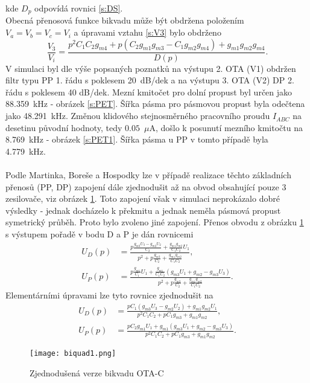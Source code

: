kde $D_p$ odpovídá rovnici \ref{s:DS}.\\
Obecná přenosová funkce bikvadu může být obdržena položením $V_a = V_b = V_c = V_i$ a úpravami vztahu \ref{s:V3} bylo obdrženo
\begin{equation}
\frac{V_3}{V_i} = \frac{p^2C_1C_2g_{m4} + p(C_2g_{m1}g_{m3} - C_1g_{m2}g_{m4}) + g_{m1}g_{m2}g_{m4}}{D(p)}.
\end{equation}
\noindent 
V simulaci byl dle výše popsaných poznatků na výstupu 2. OTA (V1) obdržen filtr typu PP 1. řádu s poklesem 20~dB/dek a na výstupu 3. OTA (V2) DP 2. řádu s poklesem 40 dB/dek. Mezní kmitočet pro dolní propust byl určen jako 88.359~kHz - obrázek \ref{s:PET}. Šířka pásma pro pásmovou propust byla odečtena jako 48.291~kHz. Změnou klidového stejnosměrného pracovního proudu $I_{ABC}$ na desetinu původní hodnoty, tedy $0.05$~$\mu$A, došlo k posunutí mezního kmitočtu na 8.769~kHz - obrázek \ref{s:PET1}. Šířka pásma u PP v tomto případě byla 4.779~kHz.\\
\\
\noindent Podle Martinka, Boreše a Hospodky \cite{12} lze v případě realizace těchto základních přenosů (PP, DP) zapojení dále zjednodušit až na obvod obsahující pouze 3 zesilovače, viz obrázek \ref{s:BIK2}. Toto zapojení však v simulaci neprokázalo dobré výsledky - jednak docházelo k překmitu a jednak neměla pásmová propust symetrický průběh. Proto bylo zvoleno jiné zapojení. Přenos obvodu z obrázku \ref{s:BIK2} s výstupem pořadě v bodu D a P je dán rovnicemi
\begin{align}
U_D(p) &= \frac{p\frac{g_{m3}U_3-g_{m2}U_2}{C_2}+\frac{g_{m1}g_{m2}}{C_1C_2}U_1}{p^2 + p\frac{g_{m3}}{C_2} + \frac{g_{m1}g_{m2}}{C_1C_2}},\\
U_P(p) &= \frac{p\frac{g_{m1}}{C_1}U_1 + \frac{g_{m1}}{C_1C_2}(g_{m3}U_1+g_{m2}-g_{m3}U_3)}{p^2 + p\frac{g_{m3}}{C_2} + \frac{g_{m1}g_{m2}}{C_1C_2}}.
\end{align}
\noindent Elementárními úpravami lze tyto rovnice zjednodušit na
\begin{align}
U_D(p) &= \frac{pC_1(g_{m3}U_3 - g_{m2}U_2) + g_{m1}g_{m2}U_1}{p^2C_1C_2 + pC_1g_{m3} + g_{m1}g_{m2}},\\
U_P(p) &= \frac{pC_2g_{m1}U_1 + g_{m1}(g_{m3}U_1 + g_{m2} - g_{m3}U_3)}{p^2C_1C_2 + pC_1g_{m3} + g_{m1}g_{m2}}.
\end{align}
\begin{figure}[h]
\centering
\texttt{[image: biquad1.png]}
\caption[Zjednodušená verze bikvadu OTA-C]{Zjednodušená verze bikvadu OTA-C \label{s:BIK2}}
\end{figure}
